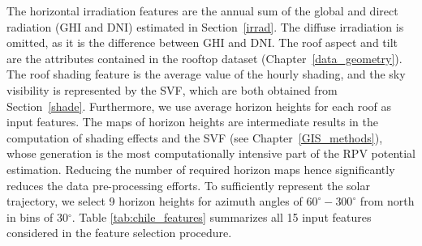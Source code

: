 The horizontal irradiation features are the annual sum of the global and direct radiation (GHI and DNI) estimated in Section~\ref{irrad}. The diffuse irradiation is omitted, as it is the difference between GHI and DNI.
The roof aspect and tilt are the attributes contained in the rooftop dataset (Chapter~\ref{data_geometry}). 
The roof shading feature is the average value of the hourly shading, and the sky visibility is represented by the SVF, which are both obtained from Section~\ref{shade}.
Furthermore, we use average horizon heights for each roof as input features. 
The maps of horizon heights are intermediate results in the computation of shading effects and the SVF (see Chapter~\ref{GIS_methods}), whose generation is the most computationally intensive part of the RPV potential estimation. Reducing the number of required horizon maps hence significantly reduces the data pre-processing efforts.
To sufficiently represent the solar trajectory, we select 9 horizon heights for azimuth angles of $60^\circ-300^\circ$ from north in bins of 30$^\circ$. 
Table \ref{tab:chile_features} summarizes all 15 input features considered in the feature selection procedure.

